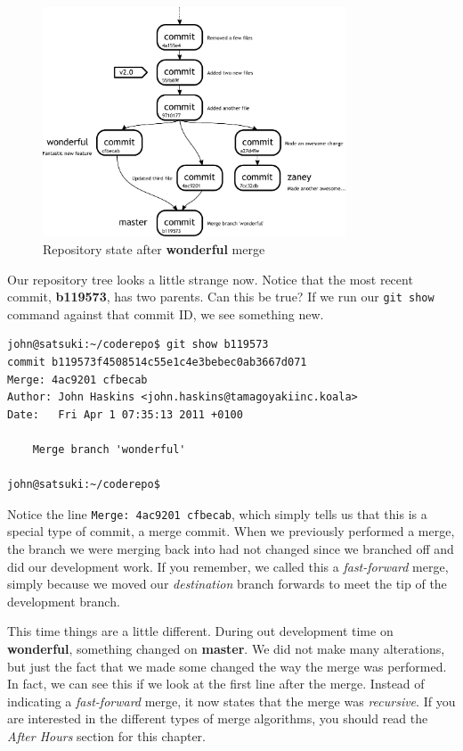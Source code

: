 \begin{figure}[hbt]
\centering
\includegraphics[width=9cm]{images/f-w4-d5.pdf}
\caption{Repository state after \textbf{wonderful} merge}
\end{figure}

Our repository tree looks a little strange now.  Notice that the most recent commit, \textbf{b119573}, has two parents.  Can this be true?  If we run our \texttt{git show} command against that commit ID, we see something new.

\begin{Verbatim}
john@satsuki:~/coderepo$ git show b119573
commit b119573f4508514c55e1c4e3bebec0ab3667d071
Merge: 4ac9201 cfbecab
Author: John Haskins <john.haskins@tamagoyakiinc.koala>
Date:   Fri Apr 1 07:35:13 2011 +0100

    Merge branch 'wonderful'

john@satsuki:~/coderepo$ 
\end{Verbatim}

Notice the line \texttt{Merge: 4ac9201 cfbecab}, which simply tells us that this is a special type of commit, a merge commit.  When we previously performed a merge, the branch we were merging back into had not changed since we branched off and did our development work.  If you remember, we called this a \emph{fast-forward} merge, simply because we moved our \emph{destination} branch forwards to meet the tip of the development branch.

This time things are a little different.  During out development time on \textbf{wonderful}, something changed on \textbf{master}.  We did not make many alterations, but just the fact that we made some changed the way the merge was performed.  In fact, we can see this if we look at the first line after the merge.  Instead of indicating a \emph{fast-forward} merge, it now states that the merge was \emph{recursive}.  If you are interested in the different types of merge algorithms, you should read the \emph{After Hours} section for this chapter.

